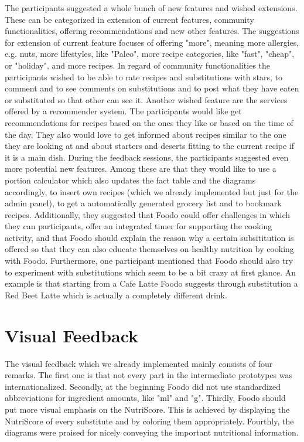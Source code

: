 The participants suggested a whole bunch of new features and wished extensions. These can be categorized in extension of current features, community functionalities, offering recommendations and new other features. The suggestions for extension of current feature focuses of offering "more", meaning more allergies, e.g. nuts, more lifestyles, like "Paleo", more recipe categories, like "fast", "cheap", or "holiday", and more recipes. In regard of community functionalities the participants wished to be able to rate recipes and substitutions with stars, to comment and to see comments on substitutions and to post what they have eaten or substituted so that other can see it. Another wished feature are the services offered by a recommender system. The participants would like get recommendations for recipes based on the ones they like or based on the time of the day. They also would love to get informed about recipes similar to the one they are looking at and about starters and deserts fitting to the current recipe if it is a main dish. During the feedback  sessions, the participants suggested even more potential new features. Among these are that they would like to use a portion calculator which also updates the fact table and the diagrams accordingly, to insert own recipes (which we already implemented but just for the admin panel), to get a automatically generated grocery list and to bookmark recipes. Additionally, they suggested that Foodo could offer challenges in which they can participants, offer an integrated timer for supporting the cooking activity, and that Foodo should explain the reason why a certain subsititution is offered so that they can also educate themselves on healthy nutrition by cooking with Foodo. Furthermore, one participant mentioned that Foodo should also try to experiment with substitutions which seem to be a bit crazy at first glance. An example is that starting from a Cafe Latte Foodo suggests through substitution a Red Beet Latte which is actually a completely different drink.
    
\section{Visual Feedback}


The visual feedback which we already implemented mainly consists of four remarks. The first one is that not every part in the intermediate prototypes was internationalized. Secondly, at the beginning Foodo did not use standardized abbreviations for ingredient amounts, like "ml" and "g". Thirdly, Foodo should put more visual emphasis on the NutriScore. This is achieved by displaying the NutriScore of every substitute and by coloring them appropriately. Fourthly, the diagrams were praised for nicely conveying the important nutritional information. 

